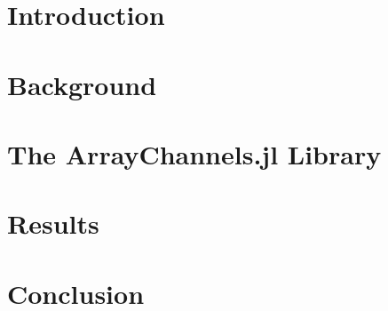 \documentclass{juliacon}
\begin{document}


\maketitle

\begin{abstract}

\end{abstract}

\section{Introduction}


\section{Background}


\section{The ArrayChannels.jl Library}


\section{Results}


\section{Conclusion}



\end{document}
